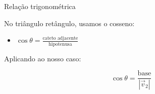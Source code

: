 \documentclass{beamer}
\begin{document}
\begin{frame}{Relação trigonométrica}


\vspace{0.5cm}

No triângulo retângulo, usamos o cosseno:

\begin{itemize}
    \item $\cos\theta = \frac{\text{cateto adjacente}}{\text{hipotenusa}}$
\end{itemize}

\vspace{0.5cm}

Aplicando ao nosso caso:

\[
\cos\theta = \frac{\text{base}}{|\vec{v}_2|}
\]

\end{frame}
\end{document}
